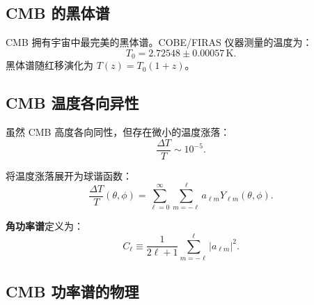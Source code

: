 \subsection{CMB 的黑体谱}

CMB 拥有宇宙中最完美的黑体谱。COBE/FIRAS 仪器测量的温度为：
\begin{equation}
    \boxed{T_0 = 2.72548 \pm 0.00057 \,\text{K}}.
    \label{eq:CMB_T}
\end{equation}
黑体谱随红移演化为 $T(z) = T_0(1+z)$。

\subsection{CMB 温度各向异性}

虽然 CMB 高度各向同性，但存在微小的温度涨落：
\begin{equation}
    \boxed{\frac{\Delta T}{T} \sim 10^{-5}}.
    \label{eq:CMB_anisotropy}
\end{equation}

将温度涨落展开为球谐函数：
\begin{equation}
    \frac{\Delta T}{T}(\theta, \phi) = \sum_{\ell=0}^{\infty} \sum_{m=-\ell}^{\ell} a_{\ell m} Y_{\ell m}(\theta, \phi).
\end{equation}

\textbf{角功率谱}定义为：
\begin{equation}
    C_\ell \equiv \frac{1}{2\ell+1} \sum_{m=-\ell}^{\ell} |a_{\ell m}|^2.
\end{equation}

\subsection{CMB 功率谱的物理}

